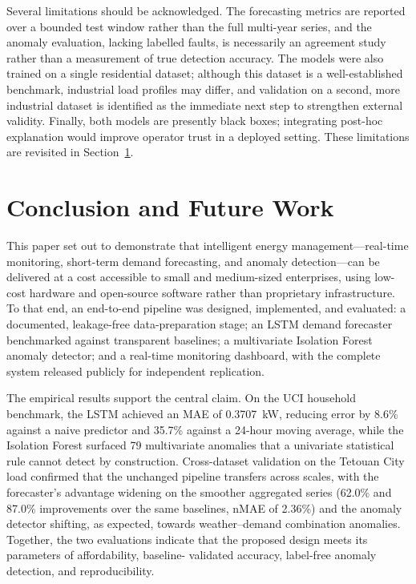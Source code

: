 \documentclass[conference]{IEEEtran}
\begin{document}
Several limitations should be acknowledged. The forecasting metrics are reported
over a bounded test window rather than the full multi-year series, and the
anomaly evaluation, lacking labelled faults, is necessarily an agreement study
rather than a measurement of true detection accuracy. The models were also
trained on a single residential dataset; although this dataset is a
well-established benchmark, industrial load profiles may differ, and validation
on a second, more industrial dataset is identified as the immediate next step to
strengthen external validity. Finally, both models are presently black boxes;
integrating post-hoc explanation would improve operator trust in a deployed
setting. These limitations are revisited in Section~\ref{sec:conclusion}.

\section{Conclusion and Future Work}\label{sec:conclusion}
This paper set out to demonstrate that intelligent energy management---real-time
monitoring, short-term demand forecasting, and anomaly detection---can be
delivered at a cost accessible to small and medium-sized enterprises, using
low-cost hardware and open-source software rather than proprietary
infrastructure. To that end, an end-to-end pipeline was designed,
implemented, and evaluated: a documented, leakage-free data-preparation
stage; an LSTM demand forecaster benchmarked against transparent baselines; a
multivariate Isolation Forest anomaly detector; and a real-time monitoring
dashboard, with the complete system released publicly for independent
replication.
 
The empirical results support the central claim. On the UCI household
benchmark, the LSTM achieved an MAE of 0.3707~kW, reducing error by 8.6\%
against a naive predictor and 35.7\% against a 24-hour moving average, while
the Isolation Forest surfaced 79 multivariate anomalies that a univariate
statistical rule cannot detect by construction. Cross-dataset validation on
the Tetouan City load confirmed that the unchanged pipeline transfers across
scales, with the forecaster's advantage widening on the smoother aggregated
series (62.0\% and 87.0\% improvements over the same baselines, nMAE of
2.36\%) and the anomaly detector shifting, as expected, towards
weather--demand combination anomalies. Together, the two evaluations indicate
that the proposed design meets its parameters of affordability, baseline-
validated accuracy, label-free anomaly detection, and reproducibility.
 
\end{document}
